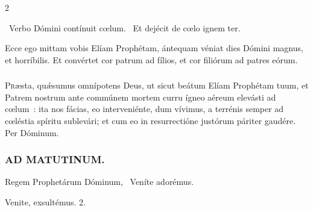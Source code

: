 \documentclass[9pt,twoside]{extarticle}
\begin{document}
\begin{multicols}{2}
{\begin{tightlist}{}
\item {}~Verbo Dómini contínuit cœlum. ~Et dejécit de cœlo ignem ter.
\item {} Ecce ego mittam vobis Elíam Prophétam, ántequam véniat dies Dómini magnus, et horríbilis. Et convértet cor patrum ad fílios, et cor filiórum ad patres eórum.
\end{tightlist}

\subsubsection*{\center {}}
\lettrine{P}ræsta, quǽsumus omnípotens Deus, ut sicut beátum Elíam Prophétam tuum, et Patrem nostrum ante commúnem mortem curru ígneo aéreum elevásti ad cœlum~: ita nos fácias, eo interveniénte, dum vívimus, a terrénis semper ad cœléstia spíritu sublevári; et cum eo in resurrectióne justórum páriter gaudére. Per Dóminum.

\subsubsection*{\center \textsc{AD MATUTINUM.}}
\begin{tightlist}{}
\item {} Regem Prophetárum Dóminum, \textred{*}~Veníte adorémus.
\item {} Venite, exsultémus. 2.
\end{tightlist}

}
\end{multicols}
\end{document}
